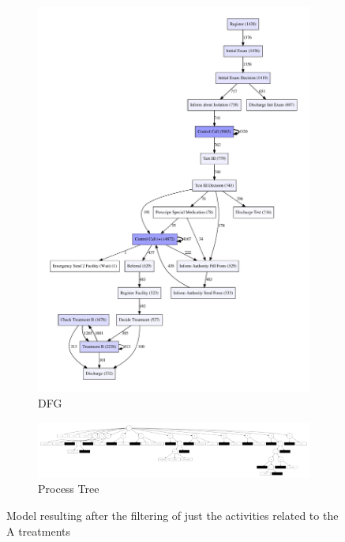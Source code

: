 \documentclass[12pt]{report}
\begin{document}
\begin{figure}[h]
    \centering
    \begin{subfigure}[b]{0.2\textwidth}
        \centering
	\includegraphics[width=\textwidth]{figures/q1_d_silent_A.pdf}
        \caption{DFG}
        \label{fig:figures-q1_d_silent_A-pdf}
    \end{subfigure}
    \hfill
    \begin{subfigure}[b]{0.7\textwidth}
        \centering
	\includegraphics[width=\textwidth]{figures/q1_d_tree_silent_A.pdf}
        \caption{Process Tree}
        \label{fig:figures-q1_d_tree_silent_A-pdf}
    \end{subfigure}
    \hfill
    \caption{Model resulting after the filtering of just the activities related to the A treatments}
    \label{fig:dfg-pt-silent-A}
\end{figure}
\end{document}
